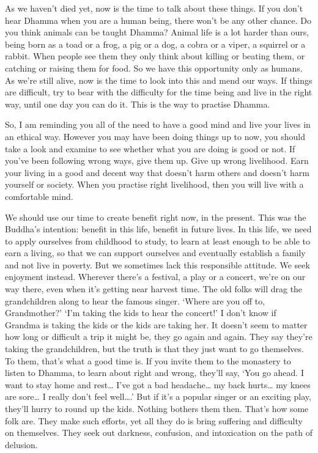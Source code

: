As we haven't died yet, now is the time to talk about these things. If
you don't hear Dhamma when you are a human being, there won't be any
other chance. Do you think animals can be taught Dhamma? Animal life is
a lot harder than ours, being born as a toad or a frog, a pig or a dog,
a cobra or a viper, a squirrel or a rabbit. When people see them they
only think about killing or beating them, or catching or raising them
for food. So we have this opportunity only as humans. As we're still
alive, now is the time to look into this and mend our ways. If things
are difficult, try to bear with the difficulty for the time being and
live in the right way, until one day you can do it. This is the way to
practise Dhamma.

So, I am reminding you all of the need to have a good mind and live your
lives in an ethical way. However you may have been doing things up to
now, you should take a look and examine to see whether what you are
doing is good or not. If you've been following wrong ways, give them up.
Give up wrong livelihood. Earn your living in a good and decent way that
doesn't harm others and doesn't harm yourself or society. When you
practise right livelihood, then you will live with a comfortable mind.

We should use our time to create benefit right now, in the present. This
was the Buddha's intention: benefit in this life, benefit in future
lives. In this life, we need to apply ourselves from childhood to study,
to learn at least enough to be able to earn a living, so that we can
support ourselves and eventually establish a family and not live in
poverty. But we sometimes lack this responsible attitude. We seek
enjoyment instead. Wherever there's a festival, a play or a concert,
we're on our way there, even when it's getting near harvest time. The
old folks will drag the grandchildren along to hear the famous singer.
`Where are you off to, Grandmother?' `I'm taking the kids to hear the
concert!' I don't know if Grandma is taking the kids or the kids are
taking her. It doesn't seem to matter how long or difficult a trip it
might be, they go again and again. They say they're taking the
grandchildren, but the truth is that they just want to go themselves. To
them, that's what a good time is. If you invite them to the monastery to
listen to Dhamma, to learn about right and wrong, they'll say, `You go
ahead. I want to stay home and rest\ldots{} I've got a bad
headache\ldots{} my back hurts\ldots{} my knees are sore\ldots{} I
really don't feel well\ldots{}.' But if it's a popular singer or an
exciting play, they'll hurry to round up the kids. Nothing bothers them
then. That's how some folk are. They make such efforts, yet all they do
is bring suffering and difficulty on themselves. They seek out darkness,
confusion, and intoxication on the path of delusion.


